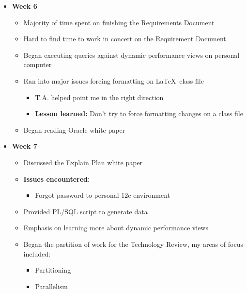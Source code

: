 \documentclass[xcolor=dvipsnames]{beamer}
\begin{document}
\begin{frame}
\begin{itemize}
	\item \textbf{Week 6}
    \begin{itemize}
    	\item Majority of time spent on finishing the Requirements Document
        \item Hard to find time to work in concert on the Requirement Document
        \item Began executing queries against dynamic performance views on personal computer
        \item Ran into major issues forcing formatting on \LaTeX \ class file
        \begin{itemize}
        	\item T.A. helped point me in the right direction
            \item \textbf{Lesson learned:} Don't try to force formatting changes on a class file
        \end{itemize}
     	\item Began reading Oracle white paper
	\end{itemize}
\end{itemize}
\end{frame}

\begin{frame}
\begin{itemize}
	\item \textbf{Week 7}
   	\begin{itemize}
		\item Discussed the Explain Plan white paper
        \item \textbf{Issues encountered:}
        \begin{itemize}
        	\item Forgot password to personal 12c environment
        \end{itemize}
        \item Provided PL/SQL script to generate data
        \item Emphasis on learning more about dynamic performance views
        \item Began the partition of work for the Technology Review, my areas of focus included:
        \begin{itemize}
        	\item Partitioning
            \item Parallelism
        \end{itemize}
	\end{itemize}
\end{itemize}
\end{frame}
\end{document}
